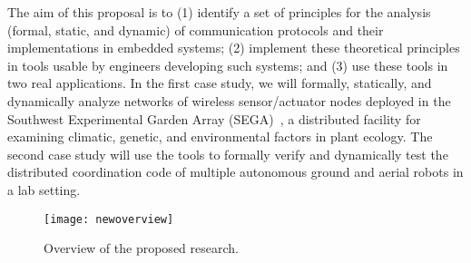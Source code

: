 The aim of this proposal is to (1) identify a set of principles for the analysis (formal, static,
  and dynamic) of communication protocols and
  their implementations in embedded systems; (2) implement these theoretical principles in tools usable by
  engineers developing such systems; and (3) use these tools in two real applications.
  In the first case study, we will formally, statically, and dynamically analyze networks
  of wireless sensor/actuator nodes deployed in the Southwest Experimental Garden
  Array (SEGA)~\cite{YamEtAl10,FliEtAl12}, a distributed facility for
  examining climatic, genetic, and environmental factors in plant ecology.
  The second case study will use the tools to formally verify and dynamically test the distributed coordination code of multiple autonomous ground and aerial robots in a lab setting.


\begin{figure}[!t]
  \centering
  \texttt{[image: newoverview]}
  \caption{Overview of the proposed research.}
  \label{fig:overview}
\end{figure}

